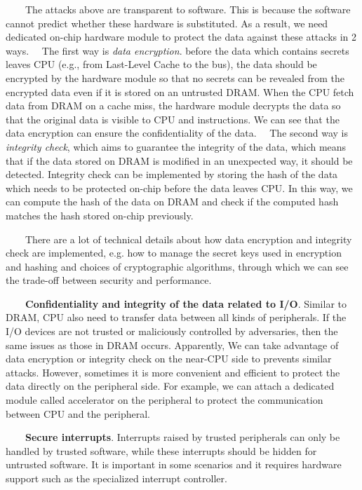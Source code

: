 \documentclass[12pt,twoside]{report}
\begin{document}
\ \ \ \ The attacks above are transparent to software. This is because the software cannot predict whether these hardware is substituted. As a result, we need dedicated on-chip hardware module to protect the data against these attacks in 2 ways. \ \ The first way is \textit{data encryption}. before the data which contains secrets leaves CPU (e.g., from Last-Level Cache to the bus), the data should be encrypted by the hardware module so that no secrets can be revealed from the encrypted data even if it is stored on an untrusted DRAM. When the CPU fetch data from DRAM on a cache miss, the hardware module decrypts the data so that the original data is visible to CPU and instructions. We can see that the data encryption can ensure the confidentiality of the data. \ \ The second way is \textit{integrity check}, which aims to guarantee the integrity of the data, which means that if the data stored on DRAM is modified in an unexpected way, it should be detected. Integrity check can be implemented by storing the hash of the data which needs to be protected on-chip before the data leaves CPU. In this way, we can compute the hash of the data on DRAM and check if the computed hash matches the hash stored on-chip previously.

\ \ \ \ There are a lot of technical details about how data encryption and integrity check are implemented, e.g. how to manage the secret keys used in encryption and hashing and choices of cryptographic algorithms, through which we can see the trade-off between security and performance.

\ \ \ \ \textbf{Confidentiality and integrity of the data related to I/O}. Similar to DRAM, CPU also need to transfer data between all kinds of peripherals. If the I/O devices are not trusted or maliciously controlled by adversaries, then the same issues as those in DRAM occurs. Apparently, We can take advantage of data encryption or integrity check on the near-CPU side to prevents similar attacks. However, sometimes it is more convenient and efficient to protect the data directly on the peripheral side. For example, we can attach a dedicated module called accelerator on the peripheral to protect the communication between CPU and the peripheral.

\ \ \ \ \textbf{Secure interrupts}. Interrupts raised by trusted peripherals can only be handled by trusted software, while these interrupts should be hidden for untrusted software. It is important in some scenarios and it requires hardware support such as the specialized interrupt controller.
\end{document}
